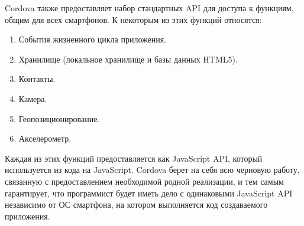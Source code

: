 Cordova также предоставляет набор стандартных API для доступа к функциям, общим для всех смартфонов. К некоторым из этих функций относятся:
\begin{enumerate}
\item События жизненного цикла приложения.
\item Хранилище (локальное хранилище и базы данных HTML5).
\item Контакты.
\item Камера.
\item Геопозиционирование.
\item Акселерометр.
\end{enumerate}

Каждая из этих функций предоставляется как JavaScript API, который используется из кода на JavaScript. Cordova берет на себя всю черновую работу, связанную с предоставлением необходимой родной реализации, и тем самым гарантирует, что программист будет иметь дело с одинаковыми JavaScript API независимо от ОС смартфона, на котором выполняется код создаваемого приложения. 

